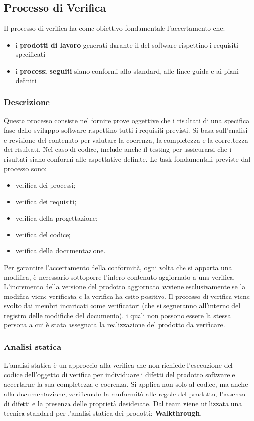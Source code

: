 \subsection{Processo di Verifica}
\label{subsec:proc_verifica}
Il processo di verifica ha come obiettivo fondamentale l'accertamento che:
\begin{itemize}
    \item i \textbf{prodotti di lavoro} generati durante il  del software rispettino i requisiti specificati
    \item i \textbf{processi seguiti} siano conformi allo standard, alle linee guida e ai piani definiti
\end{itemize}
\subsubsection{Descrizione}
Questo processo consiste nel fornire prove oggettive che i risultati di una specifica fase dello sviluppo software rispettino tutti i requisiti previsti. 
Si basa sull’analisi e revisione del contenuto per valutare la coerenza, la completezza e la correttezza dei risultati. Nel caso di codice, include anche il testing per assicurarsi che i risultati siano conformi alle aspettative definite.
Le task fondamentali previste dal processo sono:
\begin{itemize}
    \item verifica dei processi;
    \item verifica dei requisiti;
    \item verifica della progettazione;
    \item verifica del codice;
    \item verifica della documentazione.
\end{itemize}
Per garantire l'accertamento della conformità, ogni volta che si apporta una modifica, è necessario sottoporre l'intero contenuto aggiornato a una verifica. 
L'incremento della versione del prodotto aggiornato avviene esclusivamente se la modifica viene verificata e la verifica ha esito positivo.
Il processo di verifica viene svolto dai membri incaricati come verificatori (che si segneranno all'interno del registro delle modifiche del documento). 
i quali non possono essere la stessa persona a cui è stata assegnata la realizzazione del prodotto da verificare.
\subsubsection{Analisi statica}
L'analisi statica è un approccio alla verifica che non richiede l'esecuzione del codice dell'oggetto di verifica per individuare i difetti del prodotto software 
e accertarne la sua completezza e coerenza.
Si applica non solo al codice, ma anche alla documentazione, verificando la conformità alle regole del prodotto, l'assenza di difetti e la presenza delle proprietà desiderate.
Dal team viene utilizzata una tecnica standard per l'analisi statica dei prodotti: \textbf{Walkthrough}.
